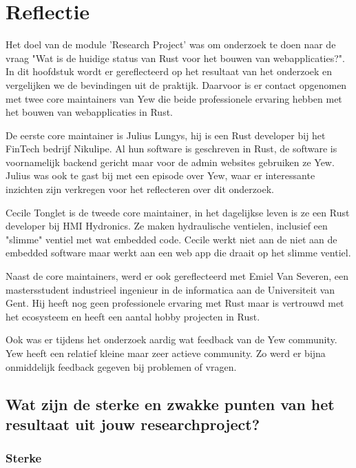 \chapter{Reflectie}
\label{reflectie}

Het doel van de module 'Research Project' was om onderzoek te doen naar de vraag "Wat is de huidige
status van Rust voor het bouwen van webapplicaties?". In dit hoofdstuk wordt er gereflecteerd op het
resultaat van het onderzoek en vergelijken we de bevindingen uit de praktijk. Daarvoor is er contact
opgenomen met twee core maintainers van Yew die beide professionele ervaring hebben met het bouwen
van webapplicaties in Rust. 

De eerste core maintainer is Julius Lungys, hij is een Rust developer bij het FinTech bedrijf
Nikulipe. Al hun software is geschreven in Rust, de software is voornamelijk backend gericht maar
voor de admin websites gebruiken ze Yew. Julius was ook te gast bij 
\cite{podcast} met een episode over Yew, waar er interessante inzichten zijn verkregen voor het
reflecteren over dit onderzoek.

Cecile Tonglet is de tweede core maintainer, in het dagelijkse leven is ze een Rust developer bij
HMI Hydronics. Ze maken hydraulische ventielen, inclusief een "slimme" ventiel met wat embedded
code. Cecile werkt niet aan de niet aan de embedded software maar werkt aan een web app die draait
op het slimme ventiel.

Naast de core maintainers, werd er ook gereflecteerd met Emiel Van Severen, een mastersstudent
industrieel ingenieur in de informatica aan de Universiteit van Gent. Hij heeft nog geen
professionele ervaring met Rust maar is vertrouwd met het ecosysteem en heeft een aantal hobby
projecten in Rust.

Ook was er tijdens het onderzoek aardig wat feedback van de Yew community. Yew heeft een relatief
kleine maar zeer actieve community. Zo werd er bijna onmiddelijk feedback gegeven bij problemen of
vragen.

\clearpage

\section{Wat zijn de sterke en zwakke punten van het resultaat uit jouw researchproject?}

\subsection{Sterke}

